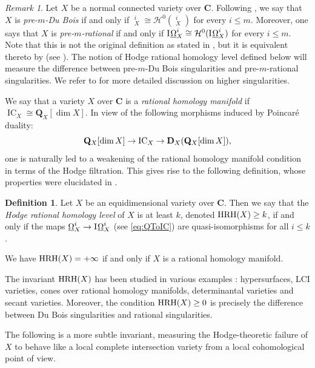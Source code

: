 \documentclass[letterpaper,11pt]{amsart}
\DeclareMathOperator{\DDB}{\underline{\Omega}}
\DeclareMathOperator{\IO}{I\hspace{0.07em}\underline{\Omega}}
\DeclareMathOperator{\IC}{IC}
\theoremstyle{plain}
\theoremstyle{definition}
\newtheorem{defi}[thm]{Definition}
\theoremstyle{remark}
\newtheorem{rmk}[thm]{Remark}
\def\Q{{\mathbf Q}}
\def\C{{\mathbf C}}
\def\cH{\mathcal{H}}
\begin{document}
\begin{rmk} Let $X$ be a normal connected variety over $\C$. Following \cite{SVV}, we say that $X$ is \emph{pre-$m$-Du Bois} if and only if $\DDB^i_X \cong \cH^0(\DDB^i_X)$ for every $i \leq m$. Moreover, one says that $X$ is \emph{pre-$m$-rational} if and only if $\IO^i_X \cong \cH^0(\IO^i_X)$ for every $i \leq m$. Note that this is not the original definition as stated in \cite{SVV}, but it is equivalent thereto by \cites{ParkPopa,PSV,DOR1} (see \cite[Corollary 4.10]{KW}). The notion of Hodge rational homology level defined below will measure the difference between pre-$m$-Du Bois singularities and pre-$m$-rational singularities. We refer to \cites{MOPW,JKSY,MPLocCoh,FL,CDM, DOR1,CDOIsolated,SVV,PSV,PPFactorial,KW} for more detailed discussion on higher singularities. 
\end{rmk}

We say that a variety $X$ over $\C$ is a \emph{rational homology manifold} if $\IC_X \cong \Q_X[\dim X]$. In view of the following morphisms induced by Poincar\'{e} duality:
\begin{equation} \label{eq-PD} \Q_X[\dim X] \to {\rm IC}_X \to \mathbf D_X(\Q_X[\dim X]),\end{equation}
one is naturally led to a weakening of the rational homology manifold condition in terms of the Hodge filtration. This gives rise to the following definition, whose properties were elucidated in \cites{ParkPopa,DOR1}.

\begin{defi} Let $X$ be an equidimensional variety over $\C$. Then we say that the \emph{Hodge rational homology level} of $X$ is at least $k$, denoted ${\rm HRH}(X) \geq k$,
if and only if the maps 
$\underline{\Omega}_X^i \to \IO_X^i$ (see \eqref{eq:QToIC}) 
are quasi-isomorphisms for all $i\leq k$.

We have ${\rm HRH}(X) = + \infty$ if and only if $X$ is a rational homology manifold.
\end{defi}

The invariant ${\rm HRH}(X)$ has been studied in various examples \cites{DOR1,DOR2,CDOIsolated,ORS}: hypersurfaces, LCI varieties, cones over rational homology manifolds, determinantal varieties and secant varieties. Moreover, the condition ${\rm HRH}(X) \geq 0$ is precisely the difference between Du Bois singularities and rational singularities.%

The following is a more subtle invariant, measuring the Hodge-theoretic failure of $X$ to behave like a local complete intersection variety from a local cohomological point of view.
\end{document}
